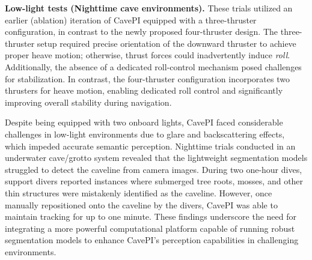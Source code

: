\vspace{1mm}
\noindent
\textbf{Low-light tests (Nighttime cave environments).} These trials utilized an earlier (ablation) iteration of CavePI equipped with a three-thruster configuration, in contrast to the newly proposed four-thruster design. The three-thruster setup required precise orientation of the downward thruster to achieve proper heave motion; otherwise, thrust forces could inadvertently induce \textit{roll}. Additionally, the absence of a dedicated roll-control mechanism posed challenges for stabilization. In contrast, the four-thruster configuration incorporates two thrusters for heave motion, enabling dedicated roll control and significantly improving overall stability during navigation.

Despite being equipped with two onboard lights, CavePI faced considerable challenges in low-light environments due to glare and backscattering effects, which impeded accurate semantic perception. Nighttime trials conducted in an underwater cave/grotto system revealed that the lightweight segmentation models struggled to detect the caveline from camera images. During two one-hour dives, support divers reported instances where submerged tree roots, mosses, and other thin structures were mistakenly identified as the caveline. However, once manually repositioned onto the caveline by the divers, CavePI was able to maintain tracking for up to one minute. These findings underscore the need for integrating a more powerful computational platform capable of running robust segmentation models to enhance CavePI’s perception capabilities in challenging environments.











